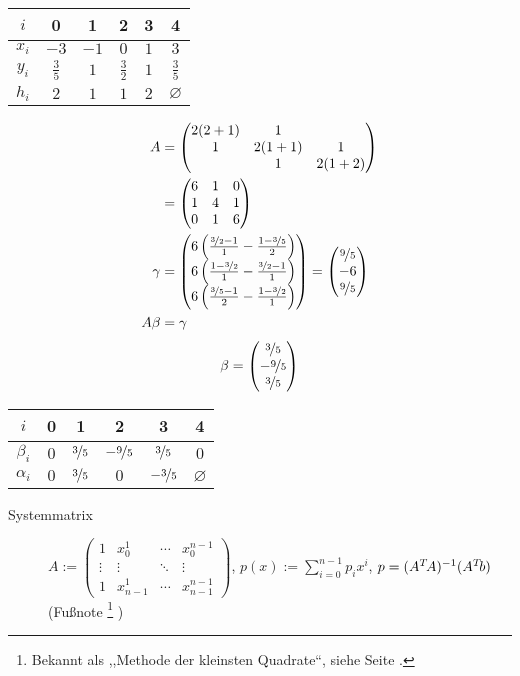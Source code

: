 \noindent\begin{center}
\begin{tabular}{c|ccccc}
$i$ & 0 & 1 & 2 & 3 & 4 \\
\hline 
  $x_{i}$ & $-3$          & $-1$ & $0$           & $1$ & $3$          \\
  $y_{i}$ & $\frac{3}{5}$ & $1$  & $\frac{3}{2}$ & $1$ & $\frac{3}{5}$\\
  $h_{i}$ & $2$           & $1$  & $1$           & $2$ & $\varnothing$\\
\end{tabular}
\end{center}

\begin{align*}
  A & =\begin{pmatrix}
    2(2+1) & 1\\
    1      & 2(1+1) & 1\\
           & 1      & 2(1+2)
  \end{pmatrix}\\
  & =\begin{pmatrix}
    6 & 1 & 0\\
    1 & 4 & 1\\
    0 & 1 & 6
  \end{pmatrix}\\
  \gamma & = \veccc(
    6\left(\frac{\nicefrac{3}{2}-1}{1}-\frac{1-\nicefrac{3}{5}}{2}\right);
    6\left(\frac{1-\nicefrac{3}{2}}{1}-\frac{\nicefrac{3}{2}-1}{1}\right);
    {6\left(\frac{\nicefrac{3}{5}-1}{2}-\frac{1-\nicefrac{3}{2}}{1}\right)})
  = \veccc(
    \nicefrac{9}{5};
    -6;
    \nicefrac{9}{5}) \\
  A\beta & =\gamma
\end{align*}
\[ \beta= \veccc(\nicefrac{3}{5}; -\nicefrac{9}{5}; \nicefrac{3}{5}) \]


\noindent \begin{center}
\begin{tabular}{c|ccccc}
  $i$ & 0 & 1 & 2 & 3 & 4 \\
  \hline 
  $\beta_i$  & $0$ & $\nicefrac{3}{5}$ & $-\nicefrac{9}{5}$ & $\nicefrac{3}{5}$  & $0$ \\
  $\alpha_i$ & $0$ & $\nicefrac{3}{5}$ & $0$                & $-\nicefrac{3}{5}$ & $\varnothing$ \\
\end{tabular}
\end{center}

\begin{description}
  \item [{Systemmatrix}]
	$A := \begin{pmatrix}
	  1      & x_0^1     & \cdots & x_0^{n-1} \\
	  \vdots & \vdots    & \ddots & \vdots    \\
	  1      & x_{n-1}^1 & \cdots & x_{n-1}^{n-1}
	\end{pmatrix}$,
	$ p(x) := \sum_{i=0}^{n-1} p_i x^i$,
	$ p=(A\T A)^{-1} (A\T b)$
	(Fußnote%
	\footnote{Bekannt als ,,Methode der kleinsten Quadrate``, siehe Seite \pageref{sub:Methode-der-kleinsten-Quad}.}%
	)
\end{description}

